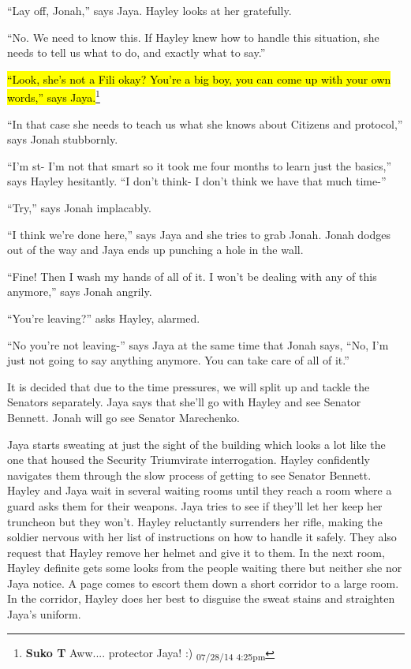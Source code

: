 ``Lay off, Jonah,'' says Jaya.  Hayley looks at her gratefully.

``No.  We need to know this.  If Hayley knew how to handle this situation, she needs to tell us what to do, and exactly what to say.''

\hl{``Look, she's not a Fili okay?   You're a big boy, you can come up with your own words,'' says Jaya.}\footnote{\textbf{Suko T }Aww.... protector Jaya! :) \textsubscript{07/28/14 4:25pm}}

``In that case she needs to teach us what she knows about Citizens and protocol,'' says Jonah stubbornly.

``I'm st- I'm not that smart so it took me four months to learn just the basics,'' says Hayley hesitantly.  ``I don't think- I don't think we have that much time-''

``Try,'' says Jonah implacably. 

``I think we're done here,'' says Jaya and she tries to grab Jonah.  Jonah dodges out of the way and Jaya ends up punching a hole in the wall.

``Fine!  Then I wash my hands of all of it.  I won't be dealing with any of this anymore,'' says Jonah angrily.

``You're leaving?'' asks Hayley, alarmed.

``No you're not leaving-'' says Jaya at the same time that Jonah says, ``No, I'm just not going to say anything anymore.  You can take care of all of it.''



It is decided that due to the time pressures, we will split up and tackle the Senators separately.  Jaya says that she'll go with Hayley and see Senator Bennett.  Jonah will go see Senator Marechenko.



Jaya starts sweating at just the sight of the building which looks a lot like the one that housed the Security Triumvirate interrogation.  Hayley confidently navigates them through the slow process of getting to see Senator Bennett.  Hayley and Jaya wait in several waiting rooms until they reach a room where a guard asks them for their weapons.  Jaya tries to see if they'll let her keep her truncheon but they won't.  Hayley reluctantly surrenders her rifle, making the soldier nervous with her list of instructions on how to handle it safely.  They also request that Hayley remove her helmet and give it to them.  In the next room, Hayley definite gets some looks from the people waiting there but neither she nor Jaya notice.  A page comes to escort them down a short corridor to a large room.   In the corridor, Hayley does her best to disguise the sweat stains and straighten Jaya's uniform.



